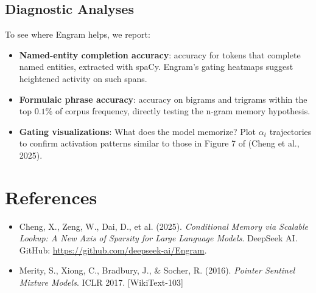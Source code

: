 \documentclass[11pt]{article}
\begin{document}
\subsection{Diagnostic Analyses}
To see where Engram helps, we report:
\begin{itemize}
    \item \textbf{Named-entity completion accuracy}: accuracy for tokens that complete named entities, extracted with spaCy. Engram's gating heatmaps suggest heightened activity on such spans.
    \item \textbf{Formulaic phrase accuracy}: accuracy on bigrams and trigrams within the top $0.1\%$ of corpus frequency, directly testing the n-gram memory hypothesis.
    \item \textbf{Gating visualizations}: What does the model memorize? Plot $\alpha_t$ trajectories to confirm activation patterns similar to those in Figure 7 of (Cheng et al., 2025).
\end{itemize}

\section{References}

\begin{itemize}
    \item Cheng, X., Zeng, W., Dai, D., et al. (2025). \emph{Conditional Memory via Scalable Lookup: A New Axis of Sparsity for Large Language Models}. DeepSeek AI. GitHub: \url{https://github.com/deepseek-ai/Engram}.
    \item Merity, S., Xiong, C., Bradbury, J., \& Socher, R. (2016). \emph{Pointer Sentinel Mixture Models}. ICLR 2017. [WikiText-103]
\end{itemize}
\end{document}
